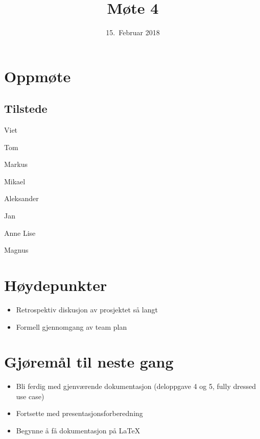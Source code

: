 \documentclass[letterpaper,11pt]{article}
\title{Møte 4}
\date{15.~Februar 2018}
\begin{document}
\maketitle
\section*{Oppmøte}
\subsection*{Tilstede}
\begin{list}{}{}
	\item Viet
	\item Tom
	\item Markus
	\item Mikael
	\item Aleksander
	\item Jan
	\item Anne Lise
	\item Magnus
\end{list}

\newpage
\section*{Høydepunkter}
\begin{itemize}
	\item Retrospektiv diskusjon av prosjektet så langt
	\item Formell gjennomgang av team plan
\end{itemize}

\section*{Gjøremål til neste gang}
\begin{itemize}
	\item Bli ferdig med gjenværende dokumentasjon (deloppgave 4 og 5, fully dressed use case)
	\item Fortsette med presentasjonsforberedning
	\item Begynne å få dokumentasjon på LaTeX
\end{itemize}
\end{document}

